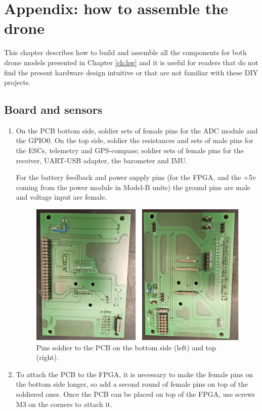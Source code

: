 \chapter{Appendix: how to assemble the drone}\label{app:build}
This chapter describes how to build and assemble all the components for both drone models presented in Chapter \ref{ch:hw} and it is useful for readers that do not find the present hardware design intuitive or that are not familiar with these DIY projects.

\section*{Board and sensors}

\begin{enumerate}
    \item On the PCB bottom side, soldier sets of female pins for the ADC module and the GPIO0. 
    On the top side, soldier the resistances and sets of male pins for the ESCs, telemetry and GPS-compass; soldier sets of female pins for the receiver, UART-USB adapter, the barometer and IMU.
    
    
    For the battery feedback and power supply pins (for the FPGA, and the +5v coming from the power module in Model-B units) the ground pins are male and voltage input are female.
    
\begin{figure} [H]
    \centering
    \includegraphics[scale=0.5]{Figures/build/PCB_topBottom.png}
    \caption{Pins soldier to the PCB on the bottom side (left) and top (right).}
    \label{fig:build_pins}
\end{figure}
    
    \item To attach the PCB to the FPGA, it is necessary to make the female pins on the bottom side longer, so add a second round of female pins on top of the soldiered ones. Once the PCB can be placed on top of the FPGA, use screws M3 on the corners to attach it.
    

\end{enumerate}
